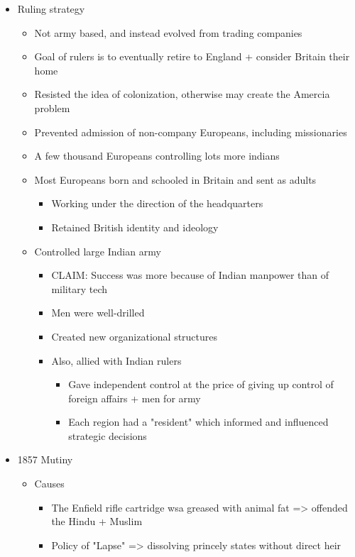 \documentclass[letterpaper]{article}
\begin{document}
\begin{itemize}
\begin{itemize}
\item Ruling strategy

\begin{itemize}
\item Not army based, and instead evolved from trading companies
\item Goal of rulers is to eventually retire to England + consider
Britain their home
\item Resisted the idea of colonization, otherwise may create the
Amercia problem
\item Prevented admission of non-company Europeans, including
missionaries
\item A few thousand Europeans controlling lots more indians
\item Most Europeans born and schooled in Britain and sent as adults

\begin{itemize}
\item Working under the direction of the headquarters
\item Retained British identity and ideology
\end{itemize}

\item Controlled large Indian army

\begin{itemize}
\item CLAIM: Success was more because of Indian manpower than of
military tech
\item Men were well-drilled
\item Created new organizational structures
\item Also, allied with Indian rulers

\begin{itemize}
\item Gave independent control at the price of giving up control of
foreign affairs + men for army
\item Each region had a "resident" which informed and influenced
strategic decisions
\end{itemize}
\end{itemize}
\end{itemize}

\item 1857 Mutiny

\begin{itemize}
\item Causes

\begin{itemize}
\item The Enfield rifle cartridge wsa greased with animal fat =>
offended the Hindu + Muslim
\item Policy of "Lapse" => dissolving princely states without direct
heir
\end{itemize}


\end{itemize}
\end{itemize}
\end{itemize}
\end{document}
